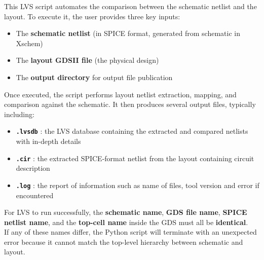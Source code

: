 \documentclass[
  11pt,
  a4paper,
  oneside]{scrbook}
\providecommand{\tightlist}{%
  \setlength{\itemsep}{0pt}\setlength{\parskip}{0pt}}
\begin{document}
This LVS script automates the comparison between the schematic netlist
and the layout. To execute it, the user provides three key inputs:

\begin{itemize}
\tightlist
\item
  The \textbf{schematic netlist} (in SPICE format, generated from
  schematic in Xschem)\\
\item
  The \textbf{layout GDSII file} (the physical design)\\
\item
  The \textbf{output directory} for output file publication
\end{itemize}

Once executed, the script performs layout netlist extraction, mapping,
and comparison against the schematic. It then produces several output
files, typically including:

\begin{itemize}
\tightlist
\item
  \textbf{\texttt{.lvsdb}} : the LVS database containing the extracted
  and compared netlists with in-depth details
\item
  \textbf{\texttt{.cir}} : the extracted SPICE-format netlist from the
  layout containing circuit description
\item
  \textbf{\texttt{.log}} : the report of information such as name of
  files, tool version and error if encountered
\end{itemize}

\begin{tcolorbox}[enhanced jigsaw, opacityback=0, breakable, colback=white, left=2mm, toprule=.15mm, arc=.35mm, coltitle=black, leftrule=.75mm, colbacktitle=quarto-callout-note-color!10!white, rightrule=.15mm, colframe=quarto-callout-note-color-frame, titlerule=0mm, title=\textcolor{quarto-callout-note-color}{\faInfo}\hspace{0.5em}{Important Naming Consistency}, toptitle=1mm, bottomtitle=1mm, bottomrule=.15mm, opacitybacktitle=0.6]

For LVS to run successfully, the \textbf{schematic name}, \textbf{GDS
file name}, \textbf{SPICE netlist name}, and the \textbf{top-cell name}
inside the GDS must all be \textbf{identical}.\\
If any of these names differ, the Python script will terminate with an
unexpected error because it cannot match the top-level hierarchy between
schematic and layout.

\end{tcolorbox}
\end{document}
